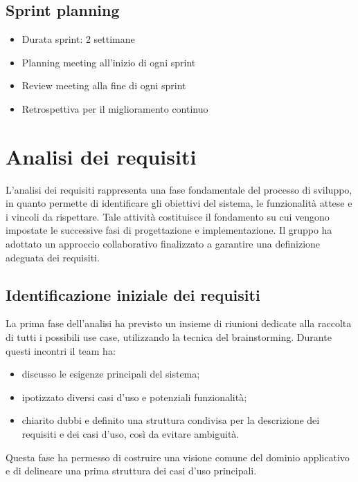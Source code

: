 \documentclass[11pt,a4paper]{article}
\begin{document}
\subsection{Sprint planning}
\begin{itemize}
    \item Durata sprint: 2 settimane
    \item Planning meeting all'inizio di ogni sprint
    \item Review meeting alla fine di ogni sprint
    \item Retrospettiva per il miglioramento continuo
\end{itemize}

\newpage

\section{Analisi dei requisiti}
L’analisi dei requisiti rappresenta una fase fondamentale del processo di sviluppo, in quanto permette di identificare gli obiettivi del sistema, le funzionalità attese e i vincoli da rispettare. Tale attività costituisce il fondamento su cui vengono impostate le successive fasi di progettazione e implementazione. 
Il gruppo ha adottato un approccio collaborativo finalizzato a garantire una definizione adeguata dei requisiti.

\subsection{Identificazione iniziale dei requisiti}
La prima fase dell’analisi ha previsto un insieme di riunioni dedicate alla raccolta di tutti i possibili use case, utilizzando la tecnica del brainstorming. Durante questi incontri il team ha:
\begin{itemize}
\item discusso le esigenze principali del sistema;
\item ipotizzato diversi casi d’uso e potenziali funzionalità;
\item chiarito dubbi e definito una struttura condivisa per la descrizione dei requisiti e dei casi d’uso, così da evitare ambiguità.
\end{itemize}
Questa fase ha permesso di costruire una visione comune del dominio applicativo e di delineare una prima struttura dei casi d’uso principali.
\end{document}
